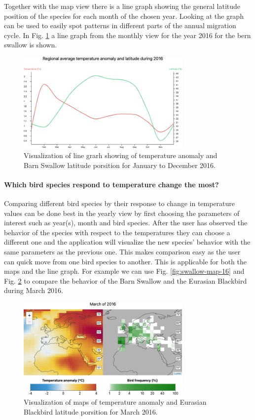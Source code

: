 \documentclass[journal]{vgtc}                %
\begin{document}
Together with the map view there is a line graph showing the general latitude position of the species for each month of the chosen year. Looking at the graph can be used to easily spot patterns in different parts of the annual migration cycle. In Fig. \ref{fig:montly-graph16} a line graph from the monthly view for the year 2016 for the bern swallow is shown. 

\begin{figure}[h]
  \centering
  \includegraphics[width=85mm]{montly-graph16-barnswallow}
  \caption{Visualization of line grarh showing of temperature anomaly and Barn Swallow latitude porsition for January to December 2016.}
  \label{fig:montly-graph16}
\end{figure}

\paragraph{Which bird species respond to temperature change the most?}

Comparing different bird species by their response to change in temperature values can be done best in the yearly view by first choosing the parameters of interest such as year(s), month and bird species. After the user has observed the behavior of the species with respect to the temperatures they can choose a different one and the application will visualize the new species' behavior with the same parameters as the previous one. This makes comparison easy as the user can quick move from one bird species to another. This is applicable for both the maps and the line graph. For example we can use Fig. \ref{fig:swallow-map-16}  and Fig. \ref{fig:march16-map-blackbird} to compare the behavior of the Barn Swallow and the Eurasian Blackbird during March 2016.

\begin{figure}[h]
  \centering
  \includegraphics[width=85mm]{march16-map-blackbird}
  \caption{Visualization of maps of temperature anomaly and Eurasian Blackbird latitude porsition for March 2016.}
  \label{fig:march16-map-blackbird}
\end{figure}
\end{document}
